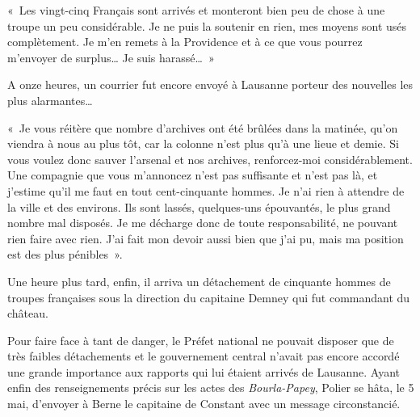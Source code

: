 \documentclass[french,twoside]{book} %
\newenvironment{quoteblock}%
  {\begin{quoting}}
  {\end{quoting}}
\newenvironment{quotebar}{%
    \def\FrameCommand{{\color{rubric!10!}\vrule width 0.5em} \hspace{0.9em}}%
    \def\OuterFrameSep{\itemsep} %
    \MakeFramed {\advance\hsize-\width \FrameRestore}
  }%
  {%
    \endMakeFramed
  }
\renewenvironment{quoteblock}%
  {%
    \savenotes
    \setstretch{0.9}
    \normalfont
    \begin{quotebar}
  }
  {%
    \end{quotebar}
    \spewnotes
  }
\begin{document}
\begin{quoteblock}
 \noindent « Les vingt-cinq Français sont arrivés et monteront bien peu de chose à une troupe un peu considérable. Je ne puis la soutenir en rien, mes moyens sont usés complètement. Je m’en remets à la Providence et à ce que vous pourrez m’envoyer de surplus… Je suis harassé… »
 \end{quoteblock}

\noindent A onze heures, un courrier fut encore envoyé à Lausanne porteur des nouvelles les plus alarmantes…\par

\begin{quoteblock}
 \noindent « Je vous réitère que nombre d’archives ont été brûlées dans la matinée, qu’on viendra à nous au plus tôt, car la colonne n’est plus qu’à une lieue et demie. Si vous voulez donc sauver l’arsenal et nos archives, renforcez-moi considérablement. Une compagnie que vous m’annoncez n’est pas suffisante et n’est pas là, et j’estime qu’il me faut en tout cent-cinquante hommes. Je n’ai rien à attendre de la ville et des environs. Ils sont lassés, quelques-uns épouvantés, le plus grand nombre mal disposés. Je me décharge donc de toute responsabilité, ne pouvant rien faire avec rien. J’ai fait mon devoir aussi bien que j’ai pu, mais ma position est des plus pénibles ».
 \end{quoteblock}

\noindent Une heure plus tard, enfin, il arriva un détachement de cinquante hommes de troupes françaises sous la direction du capitaine Demney qui fut commandant du château.\par
Pour faire face à tant de danger, le Préfet national ne pouvait disposer que de très faibles détachements et le gouvernement central n’avait pas encore accordé une grande importance aux rapports qui lui étaient arrivés de Lausanne. Ayant enfin des renseignements précis sur les actes des \emph{Bourla-Papey}, Polier se hâta, le 5 mai, d’envoyer à Berne le capitaine de Constant avec un message circonstancié.\par
\end{document}
